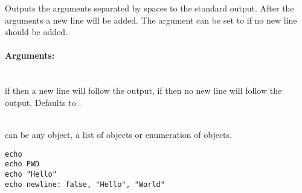 %

Outputs the arguments separated by spaces to the standard output. After 
the arguments a new line will be added. The argument  can be set
to  if no new line should be added.

\paragraph{Arguments:}

\begin{asparadesc}
%
\item[\code{newLine: true|false}]  \hfill \\
if  then a new line will follow the output,
if  then no new line will follow the output. Defaults to .
%
\item[\code{arguments\dots}]  \hfill \\
can be any object, a list of objects or enumeration of objects.
%
\end{asparadesc}

\begin{lstlisting}[style=Groovybash, label={lst:example_echo}]
echo
echo PWD
echo "Hello"
echo newline: false, "Hello", "World"
\end{lstlisting}

